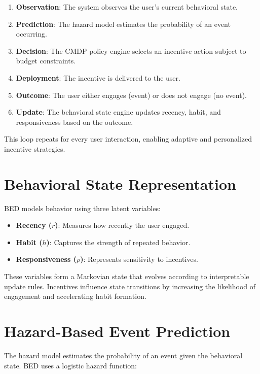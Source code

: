 \begin{enumerate}
    \item \textbf{Observation}: The system observes the user's current
    behavioral state.
    \item \textbf{Prediction}: The hazard model estimates the probability of an
    event occurring.
    \item \textbf{Decision}: The CMDP policy engine selects an incentive action
    subject to budget constraints.
    \item \textbf{Deployment}: The incentive is delivered to the user.
    \item \textbf{Outcome}: The user either engages (event) or does not engage
    (no event).
    \item \textbf{Update}: The behavioral state engine updates recency, habit,
    and responsiveness based on the outcome.
\end{enumerate}

This loop repeats for every user interaction, enabling adaptive and personalized
incentive strategies.

\section{Behavioral State Representation}

BED models behavior using three latent variables:

\begin{itemize}
    \item \textbf{Recency ($r$)}: Measures how recently the user engaged.
    \item \textbf{Habit ($h$)}: Captures the strength of repeated behavior.
    \item \textbf{Responsiveness ($\rho$)}: Represents sensitivity to incentives.
\end{itemize}

These variables form a Markovian state that evolves according to interpretable
update rules. Incentives influence state transitions by increasing the
likelihood of engagement and accelerating habit formation.

\section{Hazard-Based Event Prediction}

The hazard model estimates the probability of an event given the behavioral
state. BED uses a logistic hazard function:



